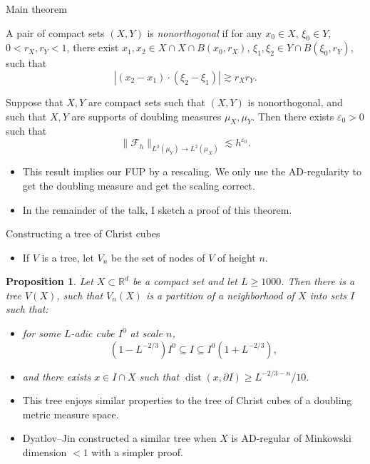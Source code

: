 \documentclass[10pt]{beamer}
\newcommand{\RR}{\mathbb{R}}
\DeclareMathOperator{\dist}{dist}
\newtheorem{proposition}{Proposition}
\begin{document}
\begin{frame}{Main theorem}
\begin{definition}
A pair of compact sets $(X, Y)$ is \emph{nonorthogonal} if for any $x_0 \in X$, $\xi_0 \in Y$, $0 < r_X, r_Y < 1$, there exist $x_1, x_2 \in X \cap X \cap B(x_0, r_X)$, $\xi_1, \xi_2 \in Y \cap B(\xi_0, r_Y)$, such that 
$$|(x_2 - x_1) \cdot (\xi_2 - \xi_1)| \gtrsim r_X r_Y.$$
\end{definition} \pause

\begin{theorem}
Suppose that $X, Y$ are compact sets such that $(X, Y)$ is nonorthogonal, and such that $X, Y$ are supports of doubling measures $\mu_X, \mu_Y$. Then there exists $\varepsilon_0 > 0$ such that 
$$\|\mathscr F_h\|_{L^2(\mu_Y) \to L^2(\mu_X)} \lesssim h^{\varepsilon_0}.$$
\end{theorem} \pause

\begin{itemize}
\item This result implies our FUP by a rescaling. We only use the AD-regularity to get the doubling measure and get the scaling correct. \pause
\item In the remainder of the talk, I sketch a proof of this theorem.
\end{itemize}
\end{frame}

\begin{frame}{Constructing a tree of Christ cubes}
\begin{itemize}
\item If $V$ is a tree, let $V_n$ be the set of nodes of $V$ of height $n$. \pause
\end{itemize}

\begin{proposition}
Let $X \subset \RR^d$ be a compact set and let $L \geq 1000$. Then there is a tree $V(X)$, such that $V_n(X)$ is a partition of a neighborhood of $X$ into sets $I$ such that:
\begin{itemize}
\item[(a)] for some $L$-adic cube $I^0$ at scale $n$, 
$$(1 - L^{-2/3}) I^0 \subseteq I \subseteq I^0(1 + L^{-2/3}),$$
\item[(b)] and there exists $x \in I \cap X$ such that $\dist(x, \partial I) \geq L^{-2/3-n}/10$.
\end{itemize}
\end{proposition} \pause

\begin{itemize}
\item This tree enjoys similar properties to the tree of Christ cubes of a doubling metric measure space. \pause
\item Dyatlov--Jin constructed a similar tree when $X$ is AD-regular of Minkowski dimension $< 1$ with a simpler proof.
\end{itemize}
\end{frame}
\end{document}
